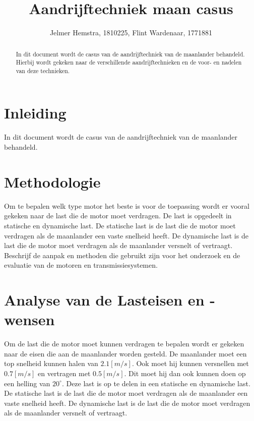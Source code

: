 \documentclass{article}
\title{Aandrijftechniek maan casus}
\author{Jelmer Hemstra, 1810225, Flint Wardenaar, 1771881}
\begin{document}
\maketitle

\begin{abstract}
    In dit document wordt de casus van de aandrijftechniek van de maanlander behandeld. Hierbij wordt gekeken naar de verschillende aandrijftechnieken en de voor- en nadelen van deze technieken.
\end{abstract}



\section{Inleiding}
    In dit document wordt de casus van de aandrijftechniek van de maanlander behandeld. 


\section{Methodologie}
    Om te bepalen welk type motor het beste is voor de toepassing wordt er vooral gekeken naar de last die de motor moet verdragen.
    De last is opgedeelt in statische en dynamische last. 
    De statische last is de last die de motor moet verdragen als de maanlander een vaste snelheid heeft.
    De dynamische last is de last die de motor moet verdragen als de maanlander versnelt of vertraagt.
    \newline
    Beschrijf de aanpak en methoden die gebruikt zijn voor het onderzoek en de evaluatie van de motoren en transmissiesystemen.

\section{Analyse van de Lasteisen en -wensen}
    Om de last die de motor moet kunnen verdragen te bepalen wordt er gekeken naar de eisen die aan de maanlander worden gesteld.
    De maanlander moet een top snelheid kunnen halen van $2.1[m/s]$. 
    Ook moet hij kunnen versnellen met $0.7[m/s]$ en vertragen met $0.5[m/s]$. 
    Dit moet hij dan ook kunnen doen op een helling van $20^{\circ}$.
    \newline
    \newline
    Deze last is op te delen in een statische en dynamische last.
    De statische last is de last die de motor moet verdragen als de maanlander een vaste snelheid heeft.
    De dynamische last is de last die de motor moet verdragen als de maanlander versnelt of vertraagt.
\end{document}
